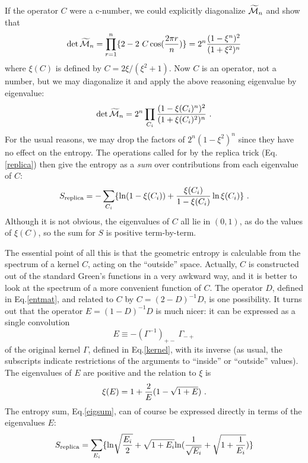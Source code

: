 \documentclass[12pt]{article}
\begin{document}
If the operator $C$ were a c-number, we could explicitly diagonalize
$\widetilde{\cal M}_n$ and show that
\begin{equation}
\det {\widetilde{\cal M}_n} =\prod_{r=1}^n\{2-2~C \cos({2\pi r\over n})\}
		= 2^n{(1 - \xi^n)^2 \over (1+\xi^2)^n}
\end{equation}
where $\xi(C)$ is defined by $C = 2\xi /( \xi^2 +1)$.
Now $C$ is an operator, not a number, but we may diagonalize it
and apply the above reasoning eigenvalue by eigenvalue:
\begin{equation}
\det {\widetilde{\cal M}_n} = 2^n\prod_{C_i}{(1 - \xi(C_i)^n)^2 \over
		(1+\xi(C_i)^2)^n}~.
\end{equation}
For the usual reasons, we may drop the factors of $2^n(1-\xi^2)^n$ since
they have no effect on the entropy. The operations called for by the replica
trick (Eq.\ref{replica}) then give the entropy as
a {\it sum} over contributions from each eigenvalue of $C$:
\begin{equation}
S_{\rm replica} = -\sum_{C_i}\{\ln(1-\xi(C_i)) +
{\xi(C_i)\over 1-\xi(C_i)} \ln\xi(C_i)\}~.
\label{eigsum}
\end{equation}
Although it is not obvious, the eigenvalues of $C$ all lie in $(0,1)$,
as do the values of $\xi(C)$, so the sum for $S$ is positive term-by-term.

The essential point of all this is that the geometric entropy is calculable
from the spectrum of a kernel $C$, acting on the ``outside'' space. Actually,
$C$ is constructed out of the standard Green's functions in a very awkward
way, and it is better to look at the spectrum of a more convenient function of
$C$. The operator $D$, defined in Eq.\ref{entmat}, and related to $C$ by
$C=(2-D)^{-1}D$, is one possibility. It turns out that the operator
$E=(1-D)^{-1}D$ is much nicer: it can be expressed as a single convolution
\begin{equation}
E \equiv -(\Gamma^{-1})_{+-}~\Gamma_{-+}
\label{newker}
\end{equation}
of the original kernel $\Gamma$,
defined in Eq.\ref{kernel}, with its inverse (as usual, the subscripts
indicate restrictions of the arguments to ``inside'' or ``outside'' values).
The eigenvalues of $E$ are positive and the relation to $\xi$ is
\begin{equation}
\xi(E) = 1+ {2\over E}(1-\sqrt{1+E})~.
\end{equation}
The entropy sum, Eq.\ref{eigsum}, can of course be expressed directly in terms
of the eigenvalues $E$:
\begin{equation}
S_{\rm replica} = \sum_{E_i}
\{{\rm \ln}\sqrt{{E_i\over 2}}+\sqrt{1+E_i}
{\rm \ln}({1\over\sqrt{E_i}}+\sqrt{1+
{1\over E_i}})  \}
\label{entsum}
\end{equation}
\end{document}
